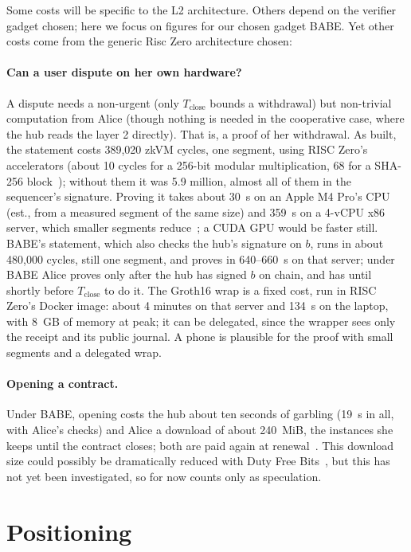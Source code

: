 \documentclass[11pt]{article}
\newcommand{\Tc}{T_{\mathrm{close}}}
\begin{document}
Some costs will be specific to the L2 architecture. Others depend on the verifier gadget chosen; here we focus on figures for our chosen gadget BABE. Yet other costs come from the generic Risc Zero architecture chosen:

\paragraph{Can a user dispute on her own hardware?} A dispute needs
a non-urgent (only $\Tc$ bounds
a withdrawal) but non-trivial computation from Alice (though nothing is needed in the cooperative case, where the hub
reads the layer 2 directly). That is, a proof of her withdrawal. As built,
the statement costs 389,020 zkVM cycles, one segment, using RISC Zero's
accelerators (about 10 cycles for a 256-bit modular multiplication, 68
for a SHA-256 block~\cite{risc0accel}); without them it was 5.9
million, almost all of them in the sequencer's signature. Proving it
takes about 30~s on an Apple M4 Pro's CPU (est., from a measured segment of the same size) and 359~s on a
4-vCPU x86 server, which smaller
segments reduce~\cite{risc0data}; a CUDA GPU would be faster still.
BABE's statement, which also checks the hub's signature on $b$, runs in
about 480,000 cycles, still one segment, and proves in 640--660~s on that
server; under BABE Alice proves only after the hub has signed $b$ on
chain, and has until shortly before $\Tc$ to do it. The Groth16 wrap is a fixed cost, run in RISC Zero's Docker image: about 4 minutes on that server and 134~s on the laptop, with 8~GB of memory at peak; it can be delegated, since the wrapper sees only the receipt and
its public journal. A phone is plausible for the proof with small segments and a delegated wrap.

\paragraph{Opening a contract.} Under BABE, opening costs the hub about ten seconds of garbling (19~s in all, with Alice's checks) and Alice a download of about 240~MiB, the instances she keeps until the contract closes; both are paid again at renewal~\cite[\S 9]{lichenbuilt}. This download size could possibly be dramatically reduced with Duty Free Bits~\cite{dutyfree}, but this has not yet been investigated, so for now counts only as speculation.

\section{Positioning}
\label{sec:positioning}
\end{document}
